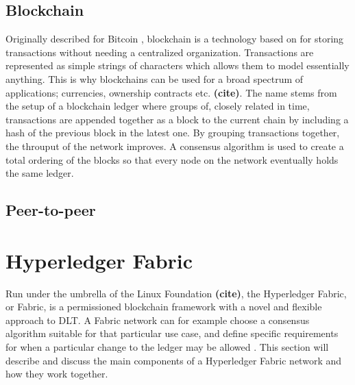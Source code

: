 \documentclass[english, biblatex, digitaloutput]{kththesis}
\begin{document}

\subsection{Blockchain}

Originally described for Bitcoin \cite{nakamoto_bitcoin_nodate, di_pierro_what_2017}, blockchain is a technology based on  for storing transactions without needing a centralized organization. Transactions are represented as simple strings of characters which allows them to model essentially anything. This is why blockchains can be used for a broad spectrum of applications; \eg currencies, ownership contracts etc. \textbf{(cite)}. The name stems from the setup of a blockchain ledger where groups of, closely related in time, transactions are appended together as a block to the current chain by including a hash of the previous block in the latest one. By grouping transactions together, the throuput of the network improves. A consensus algorithm is used to create a total ordering of the blocks so that every node on the network eventually holds the same ledger.




\subsection{Peer-to-peer}






\section{Hyperledger Fabric}

Run under the umbrella of the Linux Foundation \textbf{(cite)}, the Hyperledger Fabric, or Fabric, is a permissioned blockchain framework with a novel and flexible approach to \gls{DLT}. A Fabric network can for example choose a consensus algorithm suitable for that particular use case, and define specific requirements for when a particular change to the ledger may be allowed \cite{androulaki_hyperledger_2018}. This section will describe and discuss the main components of a Hyperledger Fabric network and how they work together.
\end{document}
